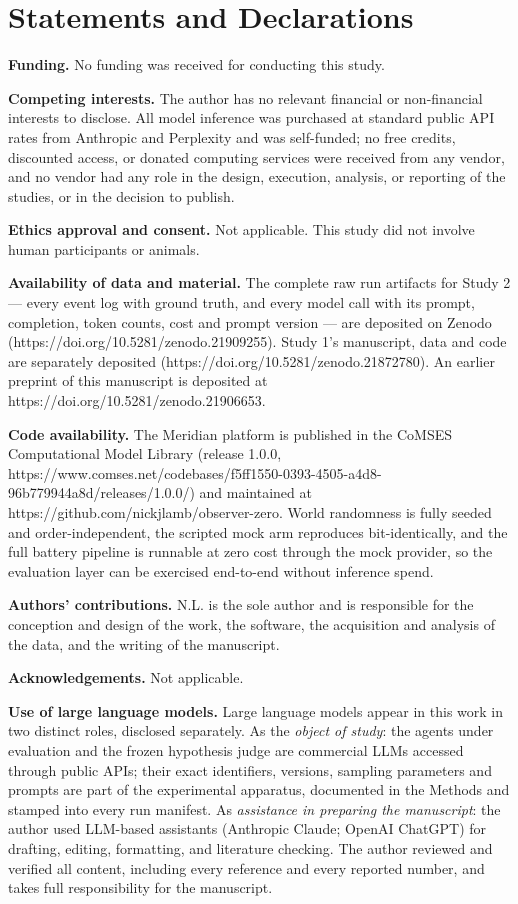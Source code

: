 \documentclass[pdflatex,sn-basic]{sn-jnl}
\begin{document}
\hypertarget{statements-and-declarations}{%
\section*{Statements and Declarations}\label{statements-and-declarations}}

\textbf{Funding.} No funding was received for conducting this study.

\textbf{Competing interests.} The author has no relevant financial or non-financial interests to
disclose. All model inference was purchased at standard public API rates from Anthropic and
Perplexity and was self-funded; no free credits, discounted access, or donated computing
services were received from any vendor, and no vendor had any role in the design, execution,
analysis, or reporting of the studies, or in the decision to publish.

\textbf{Ethics approval and consent.} Not applicable. This study did not involve human
participants or animals.

\textbf{Availability of data and material.} The complete raw run artifacts for Study 2 --- every event log with
ground truth, and every model call with its prompt, completion, token counts, cost and prompt
version --- are deposited on Zenodo (https://doi.org/10.5281/zenodo.21909255). Study 1's
manuscript, data and code are separately deposited (https://doi.org/10.5281/zenodo.21872780).
An earlier preprint of this manuscript is deposited at
https://doi.org/10.5281/zenodo.21906653.

\textbf{Code availability.} The Meridian platform is published in the CoMSES Computational Model
Library (release 1.0.0,
https://www.comses.net/codebases/f5ff1550-0393-4505-a4d8-96b779944a8d/releases/1.0.0/) and
maintained at https://github.com/nickjlamb/observer-zero. World randomness is fully seeded and
order-independent, the scripted mock arm reproduces bit-identically, and the full battery
pipeline is runnable at zero cost through the mock provider, so the evaluation layer can be
exercised end-to-end without inference spend.

\textbf{Authors' contributions.} N.L. is the sole author and is responsible for the conception and
design of the work, the software, the acquisition and analysis of the data, and the writing of
the manuscript.

\textbf{Acknowledgements.} Not applicable.

\textbf{Use of large language models.} Large language models appear in this work in two distinct
roles, disclosed separately. As the \emph{object of study}: the agents under evaluation and the
frozen hypothesis judge are commercial LLMs accessed through public APIs; their exact
identifiers, versions, sampling parameters and prompts are part of the experimental apparatus,
documented in the Methods and stamped into every run manifest. As \emph{assistance in preparing the
manuscript}: the author used LLM-based assistants (Anthropic Claude; OpenAI ChatGPT) for
drafting, editing, formatting, and literature checking. The author reviewed and verified all
content, including every reference and every reported number, and takes full responsibility
for the manuscript.
\end{document}
